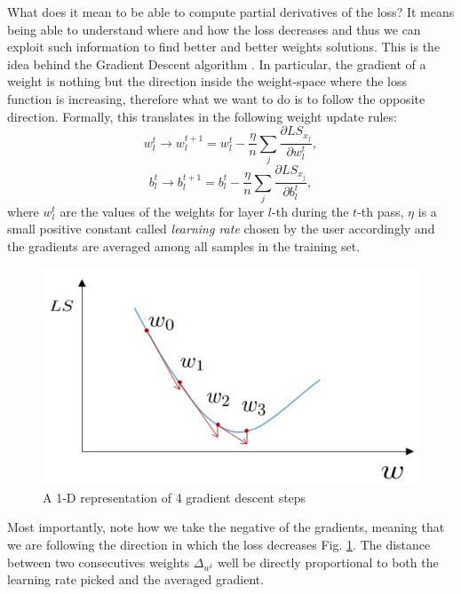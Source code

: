 \documentclass[LaM,binding=0.6cm]{./packages/sapthesis/sapthesis}
\begin{document}
               What does it mean to be able to compute partial derivatives of the loss? It means being able to understand where and how 
               the loss decreases and thus we can exploit such information to find better and better weights solutions. 
               This is the idea behind the Gradient Descent algorithm \cite{sgd}. In particular, the gradient of a weight is nothing but the
               direction inside the weight-space where the loss function is increasing, therefore what we want to do is to follow the opposite
               direction. Formally, this translates in the following weight update rules:
               \begin{equation}
                    w^{t}_{l} \rightarrow w_{l}^{t+1}=w^{t}_{l}-\frac{\eta}{n} \sum_{j} \frac{\partial LS_{x_{j}}}{\partial w^{t}_{l}},
               \end{equation}
               \begin{equation}
                b^{t}_{l} \rightarrow b^{t+1}_{l}=b^{t}_{l}-\frac{\eta}{n} \sum_{j} \frac{\partial LS_{x_{j}}}{\partial b^{t}_{l}},
               \end{equation}
            where $w_{l}^{t}$ are the values of the weights for layer $l$-th during the $t$-th pass, $\eta$ is a small positive constant called \textit{learning rate}
            chosen by the user accordingly and the gradients are averaged among all samples in the training set. 
            \begin{figure}[h!]
                \centering
                \includegraphics[scale=0.5]{gd}
                \caption{A 1-D representation of 4 gradient descent steps}
                \label{fig:gd}
            \end{figure}
            Most importantly, note how we take the negative of the gradients, meaning that we are following the direction in which the loss decreases Fig. \ref{fig:gd}. The distance
            between two consecutives weights $\Delta_{w^t}$ well be directly proportional to both the learning rate picked and the averaged gradient.
\end{document}
